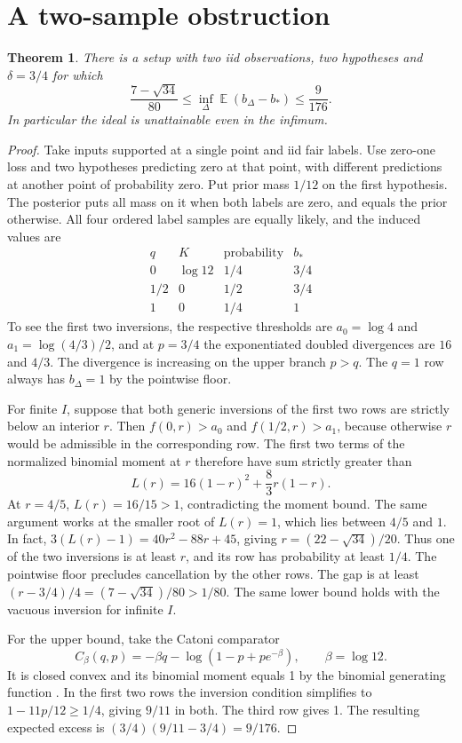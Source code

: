 \documentclass[11pt]{amsart}
\newtheorem{theorem}{Theorem}
\newcommand{\E}{\operatorname{\mathbb E}}
\begin{document}
\section{A two-sample obstruction}
\begin{theorem}
There is a setup with two iid observations, two hypotheses and
\(\delta=3/4\) for which
\[
  \frac{7-\sqrt{34}}{80}
     \le \inf_{\Delta}\E (b_\Delta-b_*) \le \frac9{176}.
\]
In particular the ideal is unattainable even in the infimum.
\end{theorem}

\begin{proof}
Take inputs supported at a single point and iid fair labels.
Use zero-one loss and two hypotheses predicting zero at that
point, with different predictions at another point of probability
zero. Put prior mass \(1/12\) on the first hypothesis. The posterior
puts all mass on it when both labels are zero, and equals the
prior otherwise. All four ordered label samples are equally likely,
and the induced values are
\[
\begin{array}{c|c|c|c}
  q&K&\text{probability}&b_*\\ \hline
  0&\log12&1/4&3/4\\
  1/2&0&1/2&3/4\\
  1&0&1/4&1
\end{array}
\]
To see the first two inversions, the respective thresholds are
\(a_0=\log4\) and \(a_1=\log(4/3)/2\), and at \(p=3/4\) the
exponentiated doubled divergences are \(16\) and \(4/3\).
The divergence is increasing on the upper branch \(p>q\).
The \(q=1\) row always has \(b_\Delta=1\) by the pointwise floor.

For finite \(I\), suppose that both generic inversions of the
first two rows are strictly below an interior \(r\).
Then \(f(0,r)>a_0\) and \(f(1/2,r)>a_1\), because otherwise \(r\)
would be admissible in the corresponding row. The first two
terms of the normalized binomial moment at \(r\) therefore have
sum strictly greater than
\[
      L(r)=16(1-r)^2+\frac{8}{3}r(1-r).
\]
At \(r=4/5\), \(L(r)=16/15>1\), contradicting the moment bound.
The same argument works at the smaller root of \(L(r)=1\),
which lies between \(4/5\) and \(1\). In fact,
\(3(L(r)-1)=40r^2-88r+45\), giving \(r=(22-\sqrt{34})/20\).
Thus one of the two inversions is at least \(r\), and its row has
probability at least \(1/4\). The pointwise floor precludes
cancellation by the other rows. The gap is at least
\((r-3/4)/4=(7-\sqrt{34})/80>1/80\).
The same lower bound holds with the vacuous inversion for
infinite \(I\).

For the upper bound, take the Catoni comparator
\[
 C_\beta(q,p)=-\beta q-\log(1-p+p e^{-\beta}),\qquad \beta=\log12 .
\]
It is closed convex and its binomial moment equals 1 by the
binomial generating function \cite[Corollary~1]{foong}.
In the first two rows the inversion condition simplifies to
\(1-11p/12\ge1/4\), giving \(9/11\) in both.
The third row gives 1. The resulting expected excess is
\((3/4)(9/11-3/4)=9/176\).
\end{proof}
\end{document}
